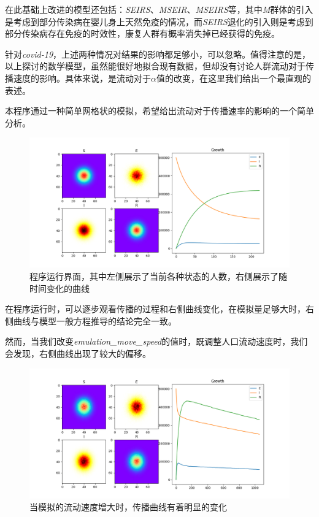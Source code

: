 \documentclass[a4paper]{ltxdoc}
\begin{document}
在此基础上改进的模型还包括：\textit{SEIRS}、\textit{MSEIR}、\textit{MSEIRS}等，其中\textit{M}群体的引入是考虑到部分传染病在婴儿身上天然免疫的情况，而\textit{SEIRS}退化的引入则是考虑到部分传染病存在免疫的时效性，康复人群有概率消失掉已经获得的免疫。

针对\textit{covid-19}，上述两种情况对结果的影响都足够小，可以忽略。值得注意的是，以上探讨的数学模型，虽然能很好地拟合现有数据，但却没有讨论人群流动对于传播速度的影响。具体来说，是流动对于$\alpha$值的改变，在这里我们给出一个最直观的表述。

本程序通过一种简单网格状的模拟，希望给出流动对于传播速率的影响的一个简单分析。

\begin{figure}[h]
    \centering
    \includegraphics[scale = 0.3]{images/1.png}
    \caption{程序运行界面，其中左侧展示了当前各种状态的人数，右侧展示了随时间变化的曲线}
\end{figure}


在程序运行时，可以逐步观看传播的过程和右侧曲线变化，在模拟量足够大时，右侧曲线与模型一般方程推导的结论完全一致。

然而，当我们改变\textit{emulation\_move\_speed}的值时，既调整人口流动速度时，我们会发现，右侧曲线出现了较大的偏移。

\begin{figure}[h]
    \centering
    \includegraphics[scale = 0.3]{images/2.png}
    \caption{当模拟的流动速度增大时，传播曲线有着明显的变化}
\end{figure}
\end{document}
